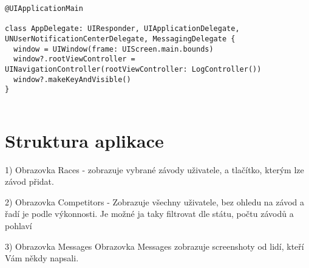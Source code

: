 \documentclass{article}
\begin{document}
\begin{verbatim}
@UIApplicationMain

class AppDelegate: UIResponder, UIApplicationDelegate,
UNUserNotificationCenterDelegate, MessagingDelegate {
  window = UIWindow(frame: UIScreen.main.bounds)
  window?.rootViewController = UINavigationController(rootViewController: LogController())
  window?.makeKeyAndVisible()
}
    
\end{verbatim}
\vspace{10 mm}




\vspace{10 mm}
\section{Struktura aplikace}

1) Obrazovka Races - zobrazuje vybrané závody uživatele, a tlačítko, kterým lze závod přidat.

\vspace{10 mm}


















2) Obrazovka Competitors - Zobrazuje všechny uživatele, bez ohledu na závod a řadí je podle výkonnosti. Je možné ja taky filtrovat dle státu, počtu závodů a pohlaví

\vspace{10 mm}













3) Obrazovka Messages
\vspace{10 mm}
Obrazovka Messages zobrazuje screenshoty od lidí, kteří Vám někdy napsali.
\vspace{10 mm}
\end{document}
